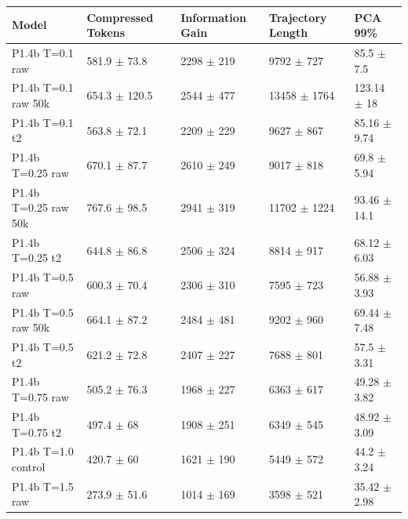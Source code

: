 \begin{tabular}{lllll}
\toprule
 Model                & Compressed Tokens           & Information Gain         & Trajectory Length         & PCA 99\%                    \\
\midrule
 P1.4b T=0.1 raw      & 581.9 {\small $\pm$ 73.8}   & 2298 {\small $\pm$ 219}  & 9792 {\small $\pm$ 727}   & 85.5 {\small $\pm$ 7.5}    \\
 P1.4b T=0.1 raw 50k  & 654.3 {\small $\pm$ 120.5}  & 2544 {\small $\pm$ 477}  & 13458 {\small $\pm$ 1764} & 123.14 {\small $\pm$ 18}   \\
 P1.4b T=0.1 t2       & 563.8 {\small $\pm$ 72.1}   & 2209 {\small $\pm$ 229}  & 9627 {\small $\pm$ 867}   & 85.16 {\small $\pm$ 9.74}  \\
 \midrule
 P1.4b T=0.25 raw     & 670.1 {\small $\pm$ 87.7}   & 2610 {\small $\pm$ 249}  & 9017 {\small $\pm$ 818}   & 69.8 {\small $\pm$ 5.94}   \\
 P1.4b T=0.25 raw 50k & 767.6 {\small $\pm$ 98.5}   & 2941 {\small $\pm$ 319}  & 11702 {\small $\pm$ 1224} & 93.46 {\small $\pm$ 14.1}  \\
 P1.4b T=0.25 t2      & 644.8 {\small $\pm$ 86.8}   & 2506 {\small $\pm$ 324}  & 8814 {\small $\pm$ 917}   & 68.12 {\small $\pm$ 6.03}  \\
 \midrule
 P1.4b T=0.5 raw      & 600.3 {\small $\pm$ 70.4}   & 2306 {\small $\pm$ 310}  & 7595 {\small $\pm$ 723}   & 56.88 {\small $\pm$ 3.93}  \\
 P1.4b T=0.5 raw 50k  & 664.1 {\small $\pm$ 87.2}   & 2484 {\small $\pm$ 481}  & 9202 {\small $\pm$ 960}   & 69.44 {\small $\pm$ 7.48}  \\
 P1.4b T=0.5 t2       & 621.2 {\small $\pm$ 72.8}   & 2407 {\small $\pm$ 227}  & 7688 {\small $\pm$ 801}   & 57.5 {\small $\pm$ 3.31}   \\
 \midrule
 P1.4b T=0.75 raw     & 505.2 {\small $\pm$ 76.3}   & 1968 {\small $\pm$ 227}  & 6363 {\small $\pm$ 617}   & 49.28 {\small $\pm$ 3.82}  \\
 P1.4b T=0.75 t2      & 497.4 {\small $\pm$ 68}     & 1908 {\small $\pm$ 251}  & 6349 {\small $\pm$ 545}   & 48.92 {\small $\pm$ 3.09}  \\
 \midrule
 P1.4b T=1.0 control  & 420.7 {\small $\pm$ 60}     & 1621 {\small $\pm$ 190}  & 5449 {\small $\pm$ 572}   & 44.2 {\small $\pm$ 3.24}   \\
 \midrule
 P1.4b T=1.5 raw      & 273.9 {\small $\pm$ 51.6}   & 1014 {\small $\pm$ 169}  & 3598 {\small $\pm$ 521}   & 35.42 {\small $\pm$ 2.98}  \\

\end{tabular}
